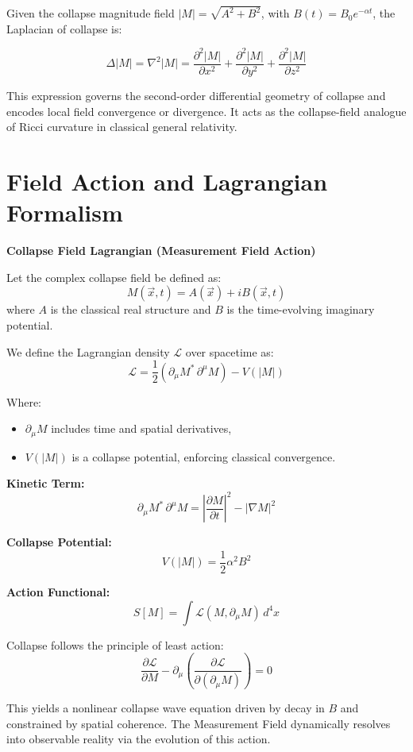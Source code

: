 \begin{theorem}
Given the collapse magnitude field $|M| = \sqrt{A^2 + B^2}$, with $B(t) = B_0 e^{-\alpha t}$, the Laplacian of collapse is:
    
\[
\Delta |M| = \nabla^2 |M| = \frac{\partial^2 |M|}{\partial x^2} + \frac{\partial^2 |M|}{\partial y^2} + \frac{\partial^2 |M|}{\partial z^2}
\]
    
This expression governs the second-order differential geometry of collapse and encodes local field convergence or divergence. \cite{imaginary_meta} It acts as the collapse-field analogue of Ricci curvature in classical general relativity. \cite{imaginary_meta} 
\end{theorem}

\section{Field Action and Lagrangian Formalism}

  \begin{mdframed}[style=collapsebox]

    \textbf{Collapse Field Lagrangian (Measurement Field Action)}
    
    Let the complex collapse field be defined as:
    \[
    M(\vec{x}, t) = A(\vec{x}) + i B(\vec{x}, t)
    \]
    where $A$ is the classical real structure and $B$ is the time-evolving imaginary potential. \cite{imaginary_meta} 
    
    We define the Lagrangian density $\mathcal{L}$ over spacetime as:
    \[
    \mathcal{L} = \frac{1}{2} \left( \partial_\mu M^* \, \partial^\mu M \right) - V(|M|)
    \]
    
    Where:
    \begin{itemize}
      \item $\partial_\mu M$ includes time and spatial derivatives,
      \item $V(|M|)$ is a collapse potential, enforcing classical convergence. \cite{imaginary_meta} 
    \end{itemize}
    
    \textbf{Kinetic Term:}
    \[
    \partial_\mu M^* \, \partial^\mu M = \left| \frac{\partial M}{\partial t} \right|^2 - \left| \nabla M \right|^2
    \]
    
    \textbf{Collapse Potential:}
    \[
    V(|M|) = \frac{1}{2} \alpha^2 B^2
    \]
    
    \textbf{Action Functional:}
    \[
    S[M] = \int \mathcal{L}(M, \partial_\mu M) \, d^4x
    \]
    
    Collapse follows the principle of least action:
    \[
    \frac{\partial \mathcal{L}}{\partial M} - \partial_\mu \left( \frac{\partial \mathcal{L}}{\partial (\partial_\mu M)} \right) = 0
    \]
    
    This yields a nonlinear collapse wave equation driven by decay in $B$ and constrained by spatial coherence. \cite{imaginary_meta} The Measurement Field dynamically resolves into observable reality via the evolution of this action. \cite{imaginary_meta}   

  \end{mdframed}
    

